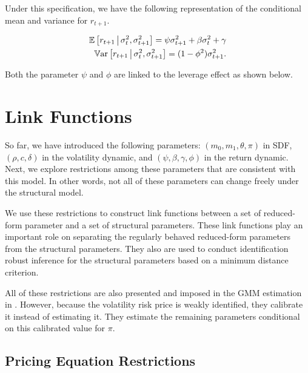 \documentclass[11pt, letterpaper, twoside]{article}
\begin{document}
Under this specification, we have the following representation of the conditional mean and variance for $r_{t+1}$.

\begin{remark} 
	\label{remark:return_moment_conditions}
	\begin{align}
		\label{eqn:rtn_cond_mean}
		\operatorname{\mathbb{E}}\left[r_{t+1} \,\middle\vert\, \sigma^2_t, \sigma^2_{t+1}\right] = \psi \sigma^2_{t+1} + \beta \sigma^2_t + \gamma \\
		\label{eqn:rtn_cond_vol}
		\operatorname{\mathbb{V}ar}\left[r_{t+1} \,\middle\vert\, \sigma^2_t, \sigma^2_{t+1}\right] = (1 - \phi^2) \sigma^2_{t+1}.
	\end{align}
\end{remark}


Both the parameter $\psi$ and $\phi$ are linked to the leverage effect as shown below.

\section{Link Functions}\label{sec:ilnk functions}

So far, we have introduced the following parameters: $(m_{0},m_{1},\theta ,\pi )$ in SDF, $(\rho ,c,\delta )$ in the volatility dynamic, and $(\psi ,\beta ,\gamma ,\phi )$ in the return dynamic. Next, we explore restrictions among these parameters that are consistent with this model. In other words, not all of these parameters can change freely under the structural model.

We use these restrictions to construct link functions between a set of reduced-form parameter and a set of structural parameters. These link functions play an important role on separating the regularly behaved reduced-form parameters from the structural parameters. They also are used to conduct identification robust inference for the structural parameters based on a minimum distance criterion.

All of these restrictions are also presented and imposed in the GMM estimation in \textcite{han2018leverage}. However, because the volatility risk price is weakly identified, they calibrate it instead of estimating it. They estimate the remaining parameters conditional on this calibrated value for $\pi$.

\subsection{Pricing Equation Restrictions}
\end{document}
